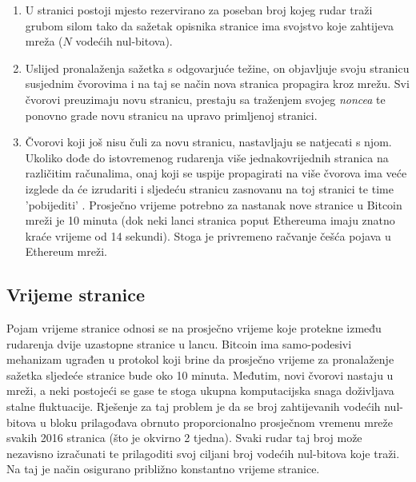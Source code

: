 \documentclass[utf8, zavrsni]{fer}
\begin{document}
\begin{enumerate}
	\item U stranici postoji mjesto rezervirano za poseban broj kojeg rudar traži grubom silom tako da sažetak opisnika stranice ima svojstvo koje zahtijeva mreža ($N$ vodećih nul-bitova)\footnotemark.
	
	\item Uslijed pronalaženja sažetka s odgovarjuće težine, on objavljuje svoju stranicu susjednim čvorovima i na taj se način nova stranica propagira kroz mrežu. Svi čvorovi preuzimaju novu stranicu, prestaju sa traženjem svojeg \textit{noncea} te ponovno grade novu stranicu na upravo primljenoj stranici.
	\item Čvorovi koji još nisu čuli za novu stranicu, nastavljaju se natjecati s njom. Ukoliko dođe do istovremenog rudarenja više jednakovrijednih stranica na različitim računalima, onaj koji se uspije propagirati na više čvorova ima veće izglede da će izrudariti i sljedeću stranicu zasnovanu na toj stranici te time 'pobijediti'\footnotemark
	\footnotemark.
	Prosječno vrijeme potrebno za nastanak nove stranice u Bitcoin mreži je 10 minuta (dok neki lanci stranica poput Ethereuma imaju znatno kraće vrijeme od 14 sekundi). Stoga je privremeno račvanje češća pojava u Ethereum mreži.
\end{enumerate}

\subsection{Vrijeme stranice}
Pojam vrijeme stranice odnosi se na prosječno vrijeme koje protekne između rudarenja dvije uzastopne stranice u lancu. Bitcoin ima samo-podesivi mehanizam ugrađen u protokol koji brine da prosječno vrijeme za pronalaženje sažetka sljedeće stranice bude oko 10 minuta. Međutim, novi čvorovi nastaju u mreži, a neki postojeći se gase te stoga ukupna komputacijska snaga doživljava stalne fluktuacije. Rješenje za taj problem je da se broj zahtijevanih vodećih nul-bitova u bloku prilagođava obrnuto proporcionalno prosječnom vremenu mreže svakih 2016 stranica (što je okvirno 2 tjedna). Svaki rudar taj broj može nezavisno izračunati te prilagoditi svoj ciljani broj vodećih nul-bitova koje traži. Na taj je način osigurano približno konstantno vrijeme stranice.
\end{document}
